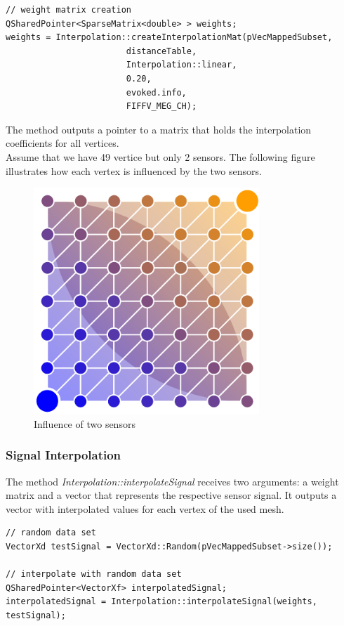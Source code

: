 \begin{lstlisting}
// weight matrix creation
QSharedPointer<SparseMatrix<double> > weights;
weights = Interpolation::createInterpolationMat(pVecMappedSubset,
						distanceTable,
						Interpolation::linear,
						0.20,
						evoked.info,
						FIFFV_MEG_CH);
\end{lstlisting}

The method outputs a pointer to a matrix that holds the interpolation coefficients for all vertices.\\
Assume that we have 49 vertice but only 2 sensors. The following figure illustrates how each vertex is influenced by the two sensors.

\begin{figure}[h]
	\begin{center}
		\includegraphics[width=8.5cm]{figures/coefficients.png}
		\caption{Influence of two sensors}
	\end{center}
\end{figure}

\subsubsection{Signal Interpolation}

The method \textit{Interpolation::interpolateSignal} receives two arguments: a weight matrix and a vector that represents the respective sensor signal. It outputs a vector with interpolated values for each vertex of the used mesh.

\begin{lstlisting}
// random data set
VectorXd testSignal = VectorXd::Random(pVecMappedSubset->size());

// interpolate with random data set
QSharedPointer<VectorXf> interpolatedSignal;
interpolatedSignal = Interpolation::interpolateSignal(weights, testSignal);
\end{lstlisting}

